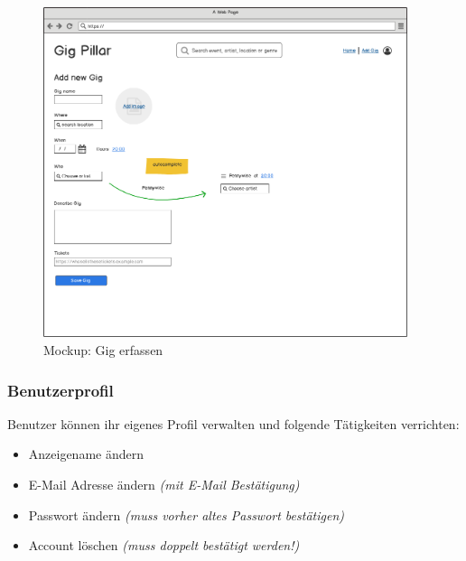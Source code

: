 \begin{figure}[!htb]
  \centering
  \includegraphics[width=0.95\textwidth]{mockups/add-gig.png}
  \caption{Mockup: Gig erfassen}
\end{figure}

\clearpage
\subsubsection{Benutzerprofil}

Benutzer können ihr eigenes Profil verwalten und folgende Tätigkeiten
verrichten:

\begin{itemize}
  \tightlist{}
  \item{} Anzeigename ändern
  \item{} E-Mail Adresse ändern \textit{(mit E-Mail Bestätigung)}
  \item{} Passwort ändern \textit{(muss vorher altes Passwort bestätigen)}
  \item{} Account löschen \textit{(muss doppelt bestätigt werden!)}
\end{itemize}

